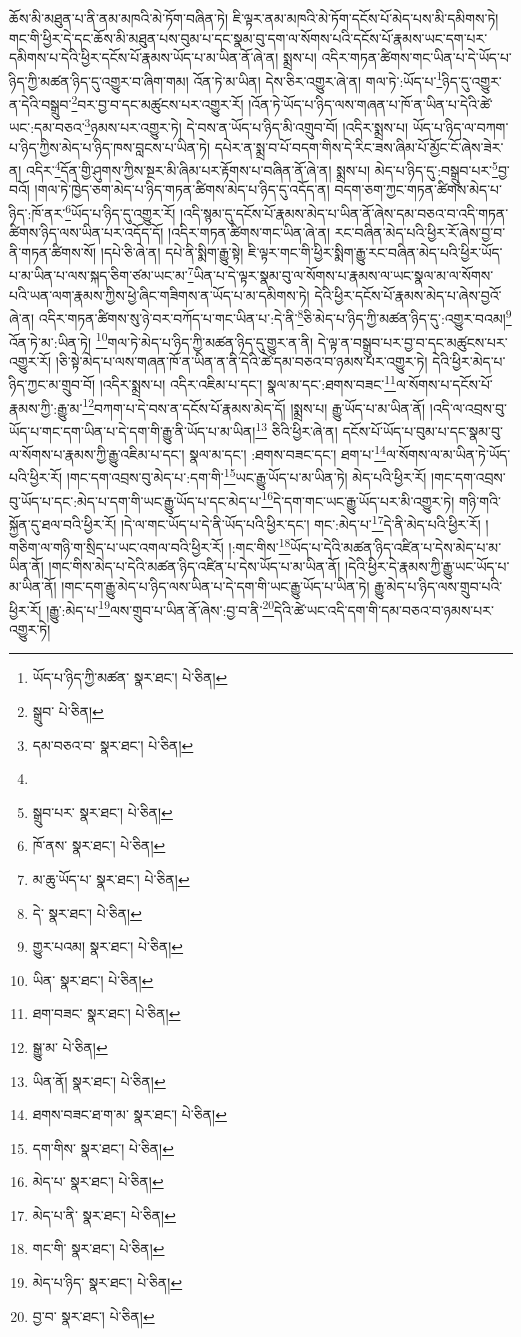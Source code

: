 ཆོས་མི་མཐུན་པ་ནི་ནམ་མཁའི་མེ་ཏོག་བཞིན་ཏེ། ཇི་ལྟར་ནམ་མཁའི་མེ་ཏོག་དངོས་པོ་མེད་པས་མི་དམིགས་ཏེ། གང་གི་ཕྱིར་དེ་དང་ཆོས་མི་མཐུན་པས་བུམ་པ་དང་སྣམ་བུ་དག་ལ་སོགས་པའི་དངོས་པོ་རྣམས་ཡང་དག་པར་དམིགས་པ་དེའི་ཕྱིར་དངོས་པོ་རྣམས་ཡོད་པ་མ་ཡིན་ནོ་ཞེ་ན། སྨྲས་པ། འདིར་གཏན་ཚིགས་གང་ཡིན་པ་དེ་ཡོད་པ་ཉིད་ཀྱི་མཚན་ཉིད་དུ་འགྱུར་བ་ཞིག་གམ། འོན་ཏེ་མ་ཡིན། དེས་ཅིར་འགྱུར་ཞེ་ན། གལ་ཏེ་:ཡོད་པ་\footnote{ཡོད་པ་ཉིད་ཀྱི་མཚན་  སྣར་ཐང་།  པེ་ཅིན། }ཉིད་དུ་འགྱུར་ན་དེའི་བསྒྲུབ་\footnote{སྒྲུབ་  པེ་ཅིན། }བར་བྱ་བ་དང་མཚུངས་པར་འགྱུར་རོ། །འོན་ཏེ་ཡོད་པ་ཉིད་ལས་གཞན་པ་ཁོ་ན་ཡིན་པ་དེའི་ཚེ་ཡང་:དམ་བཅའ་\footnote{དམ་བཅའ་བ་  སྣར་ཐང་།  པེ་ཅིན། }ཉམས་པར་འགྱུར་ཏེ། དེ་བས་ན་ཡོད་པ་ཉིད་མི་འགྲུབ་བོ། །འདིར་སྨྲས་པ། ཡོད་པ་ཉིད་ལ་བཀག་པ་ཉིད་ཀྱིས་མེད་པ་ཉིད་ཁས་བླངས་པ་ཡིན་ཏེ། དཔེར་ན་སྨྲ་བ་པོ་བདག་གིས་དེ་རིང་ཟས་ཞིམ་པོ་མྱོང་ངོ་ཞེས་ཟེར་ན། འདིར་\footnote{}དོན་གྱི་ཤུགས་ཀྱིས་སྔར་མི་ཞིམ་པར་རྟོགས་པ་བཞིན་ནོ་ཞེ་ན། སྨྲས་པ། མེད་པ་ཉིད་དུ་:བསྒྲུབ་པར་\footnote{སྒྲུབ་པར་  སྣར་ཐང་།  པེ་ཅིན། }བྱ་བའོ། །གལ་ཏེ་ཁྱེད་ཅག་མེད་པ་ཉིད་གཏན་ཚིགས་མེད་པ་ཉིད་དུ་འདོད་ན། བདག་ཅག་ཀྱང་གཏན་ཚིགས་མེད་པ་ཉིད་:ཁོ་ནར་\footnote{ཁོ་ནས་  སྣར་ཐང་།  པེ་ཅིན། }ཡོད་པ་ཉིད་དུ་འགྱུར་རོ། །འདི་སྙམ་དུ་དངོས་པོ་རྣམས་མེད་པ་ཡིན་ནོ་ཞེས་དམ་བཅའ་བ་འདི་གཏན་ཚིགས་ཉིད་ལས་ཡིན་པར་འདོད་དོ། །འདིར་གཏན་ཚིགས་གང་ཡིན་ཞེ་ན། རང་བཞིན་མེད་པའི་ཕྱིར་རོ་ཞེས་བྱ་བ་ནི་གཏན་ཚིགས་སོ། །དཔེ་ཅི་ཞེ་ན། དཔེ་ནི་སྨིག་རྒྱུ་སྟེ། ཇི་ལྟར་གང་གི་ཕྱིར་སྨིག་རྒྱུ་རང་བཞིན་མེད་པའི་ཕྱིར་ཡོད་པ་མ་ཡིན་པ་ལས་སྐད་ཅིག་ཙམ་ཡང་མ་\footnote{མ་ཆུ་ཡོད་པ་  སྣར་ཐང་།  པེ་ཅིན། }ཡིན་པ་དེ་ལྟར་སྣམ་བུ་ལ་སོགས་པ་རྣམས་ལ་ཡང་སྣལ་མ་ལ་སོགས་པའི་ཡན་ལག་རྣམས་ཀྱིས་ཕྱེ་ཞིང་གཟིགས་ན་ཡོད་པ་མ་དམིགས་ཏེ། དེའི་ཕྱིར་དངོས་པོ་རྣམས་མེད་པ་ཞེས་བྱའོ་ཞེ་ན། འདིར་གཏན་ཚིགས་སུ་ཉེ་བར་བཀོད་པ་གང་ཡིན་པ་:དེ་ནི་\footnote{དེ་  སྣར་ཐང་།  པེ་ཅིན། }ཅི་མེད་པ་ཉིད་ཀྱི་མཚན་ཉིད་དུ་:འགྱུར་བའམ།\footnote{གྱུར་པའམ།  སྣར་ཐང་།  པེ་ཅིན། } འོན་ཏེ་མ་:ཡིན་ཏེ། \footnote{ཡིན་  སྣར་ཐང་།  པེ་ཅིན། }གལ་ཏེ་མེད་པ་ཉིད་ཀྱི་མཚན་ཉིད་དུ་གྱུར་ན་ནི། དེ་ལྟ་ན་བསྒྲུབ་པར་བྱ་བ་དང་མཚུངས་པར་འགྱུར་རོ། །ཅི་སྟེ་མེད་པ་ལས་གཞན་ཁོ་ན་ཡིན་ན་ནི་དེའི་ཚེ་དམ་བཅའ་བ་ཉམས་པར་འགྱུར་ཏེ། དེའི་ཕྱིར་མེད་པ་ཉིད་ཀྱང་མ་གྲུབ་བོ། །འདིར་སྨྲས་པ། འདིར་འཇིམ་པ་དང་། སྣལ་མ་དང་:ཐགས་བཟང་\footnote{ཐག་བཟང་  སྣར་ཐང་།  པེ་ཅིན། }ལ་སོགས་པ་དངོས་པོ་རྣམས་ཀྱི་:རྒྱུ་མ་\footnote{སྒྱུ་མ་  པེ་ཅིན། }བཀག་པ་དེ་བས་ན་དངོས་པོ་རྣམས་མེད་དོ། །སྨྲས་པ། རྒྱུ་ཡོད་པ་མ་ཡིན་ནོ། །འདི་ལ་འབྲས་བུ་ཡོད་པ་གང་དག་ཡིན་པ་དེ་དག་གི་རྒྱུ་ནི་ཡོད་པ་མ་ཡིན།\footnote{ཡིན་ནོ།  སྣར་ཐང་།  པེ་ཅིན། } ཅིའི་ཕྱིར་ཞེ་ན། དངོས་པོ་ཡོད་པ་བུམ་པ་དང་སྣམ་བུ་ལ་སོགས་པ་རྣམས་ཀྱི་རྒྱུ་འཇིམ་པ་དང་། སྣལ་མ་དང་། :ཐགས་བཟང་དང་། ཐག་པ་\footnote{ཐགས་བཟང་ཐ་ག་མ་  སྣར་ཐང་།  པེ་ཅིན། }ལ་སོགས་ལ་མ་ཡིན་ཏེ་ཡོད་པའི་ཕྱིར་རོ། །གང་དག་འབྲས་བུ་མེད་པ་:དག་གི་\footnote{དག་གིས་  སྣར་ཐང་།  པེ་ཅིན། }ཡང་རྒྱུ་ཡོད་པ་མ་ཡིན་ཏེ། མེད་པའི་ཕྱིར་རོ། །གང་དག་འབྲས་བུ་ཡོད་པ་དང་:མེད་པ་དག་གི་ཡང་རྒྱུ་ཡོད་པ་དང་མེད་པ་\footnote{མེད་པ་  སྣར་ཐང་།  པེ་ཅིན། }དེ་དག་གང་ཡང་རྒྱུ་ཡོད་པར་མི་འགྱུར་ཏེ། གཉི་གའི་སྐྱོན་དུ་ཐལ་བའི་ཕྱིར་རོ། །དེ་ལ་གང་ཡོད་པ་དེ་ནི་ཡོད་པའི་ཕྱིར་དང་། གང་:མེད་པ་\footnote{མེད་པ་ནི་  སྣར་ཐང་།  པེ་ཅིན། }དེ་ནི་མེད་པའི་ཕྱིར་རོ། །གཅིག་ལ་གཉི་ག་སྲིད་པ་ཡང་འགལ་བའི་ཕྱིར་རོ། །:གང་གིས་\footnote{གང་གི་  སྣར་ཐང་།  པེ་ཅིན། }ཡོད་པ་དེའི་མཚན་ཉིད་འཛིན་པ་དེས་མེད་པ་མ་ཡིན་ནོ། །གང་གིས་མེད་པ་དེའི་མཚན་ཉིད་འཛིན་པ་དེས་ཡོད་པ་མ་ཡིན་ནོ། །དེའི་ཕྱིར་དེ་རྣམས་ཀྱི་རྒྱུ་ཡང་ཡོད་པ་མ་ཡིན་ནོ། །གང་དག་རྒྱུ་མེད་པ་ཉིད་ལས་ཡིན་པ་དེ་དག་གི་ཡང་རྒྱུ་ཡོད་པ་ཡིན་ཏེ། རྒྱུ་མེད་པ་ཉིད་ལས་གྲུབ་པའི་ཕྱིར་རོ། །རྒྱུ་:མེད་པ་\footnote{མེད་པ་ཉིད་  སྣར་ཐང་།  པེ་ཅིན། }ལས་གྲུབ་པ་ཡིན་ནོ་ཞེས་:བྱ་བ་ནི་\footnote{བྱ་བ་  སྣར་ཐང་།  པེ་ཅིན། }དེའི་ཚེ་ཡང་འདི་དག་གི་དམ་བཅའ་བ་ཉམས་པར་འགྱུར་ཏེ། 